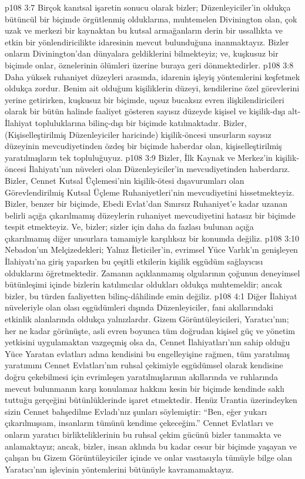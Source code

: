 \vs p108 3:7 Birçok kanıtsal işaretin sonucu olarak bizler; Düzenleyiciler’in oldukça bütüncül bir biçimde örgütlenmiş olduklarına, muhtemelen Divinington olan, çok uzak ve merkezi bir kaynaktan bu kutsal armağanların derin bir ussallıkta ve etkin bir yönlendiricilikte idaresinin mevcut bulunduğuna inanmaktayız. Bizler onların Divinington’dan dünyalara geldiklerini bilmekteyiz; ve, kuşkusuz bir biçimde onlar, öznelerinin ölümleri üzerine buraya geri dönmektedirler.
\vs p108 3:8 Daha yüksek ruhaniyet düzeyleri arasında, idarenin işleyiş yöntemlerini keşfetmek oldukça zordur. Benim ait olduğum kişiliklerin düzeyi, kendilerine özel görevlerini yerine getirirken, kuşkusuz bir biçimde, uçsuz bucaksız evren ilişkilendiricileri olarak bir bütün halinde faaliyet gösteren sayısız düzeyde kişisel ve kişilik\hyp{}dışı alt\hyp{}İlahiyat topluluklarına bilinç\hyp{}dışı bir biçimde katılmaktadır. Bizler, (Kişiselleştirilmiş Düzenleyiciler haricinde) kişilik\hyp{}öncesi unsurların sayısız düzeyinin mevcudiyetinden özdeş bir biçimde haberdar olan, kişiselleştirilmiş yaratılmışların tek topluluğuyuz.
\vs p108 3:9 Bizler, İlk Kaynak ve Merkez’in kişilik\hyp{}öncesi İlahiyatı’nın nüveleri olan Düzenleyiciler’in mevcudiyetinden haberdarız. Bizler, Cennet Kutsal Üçlemesi’nin kişilik\hyp{}ötesi dışavurumları olan Görevlendirilmiş Kutsal Üçleme Ruhaniyetleri’nin mevcudiyetini hissetmekteyiz. Bizler, benzer bir biçimde, Ebedi Evlat’dan Sınırsız Ruhaniyet’e kadar uzanan belirli açığa çıkarılmamış düzeylerin ruhaniyet mevcudiyetini hatasız bir biçimde tespit etmekteyiz. Ve, bizler; sizler için daha da fazlası bulunan açığa çıkarılmamış diğer unsurlara tamamiyle karşılıksız bir konumda değiliz.
\vs p108 3:10 Nebadon’un Melçizedekleri; Yalnız İleticiler’in, evrimsel Yüce Varlık’ın genişleyen İlahiyatı’na giriş yaparken bu çeşitli etkilerin kişilik eşgüdüm sağlayıcısı olduklarını öğretmektedir. Zamanın açıklanmamış olgularının çoğunun deneyimsel bütünleşimi içinde bizlerin katılımcılar oldukları oldukça muhtemeldir; ancak bizler, bu türden faaliyetten bilinç\hyp{}dâhilinde emin değiliz.
\vs p108 4:1 Diğer İlahiyat nüveleriyle olan olası eşgüdümleri dışında Düzenleyiciler, fani akıllarındaki etkinlik alanlarında oldukça yalnızlardır. Gizem Görüntüleyicileri, Yaratıcı’nın; her ne kadar görünüşte, asli evren boyunca tüm doğrudan kişisel güç ve yönetim yetkisini uygulamaktan vazgeçmiş olsa da, Cennet İlahiyatları’nın sahip olduğu Yüce Yaratan evlatları adına kendisini bu engelleyişine rağmen, tüm yaratılmış yaratımını Cennet Evlatları’nın ruhsal çekimiyle eşgüdümsel olarak kendisine doğru çekebilmesi için evrimleşen yaratılmışlarının akıllarında ve ruhlarında mevcut bulunmanın karşı konulamaz hakkını kesin bir biçimde kendinde saklı tuttuğu gerçeğini bütünlüklerinde işaret etmektedir. Henüz Urantia üzerindeyken sizin Cennet bahşedilme Evladı’nız şunları söylemiştir: “Ben, eğer yukarı çıkarılmışsam, insanların tümünü kendime çekeceğim.” Cennet Evlatları ve onların yaratıcı birlikteliklerinin bu ruhsal çekim gücünü bizler tanımakta ve anlamaktayız; ancak, bizler, insan aklında bu kadar cesur bir biçimde yaşayan ve çalışan bu Gizem Görüntüleyiciler içinde ve onlar vasıtasıyla tümüyle bilge olan Yaratıcı’nın işlevinin yöntemlerini bütünüyle kavramamaktayız.
